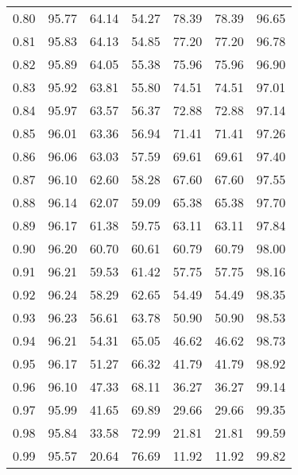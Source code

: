 \begin{tabular}{|c|c|c|c|c|c|c|}
      0.80 &     95.77 &     64.14 &      54.27 &   78.39 &      78.39 &         96.65 \\
      0.81 &     95.83 &     64.13 &      54.85 &   77.20 &      77.20 &         96.78 \\
      0.82 &     95.89 &     64.05 &      55.38 &   75.96 &      75.96 &         96.90 \\
      0.83 &     95.92 &     63.81 &      55.80 &   74.51 &      74.51 &         97.01 \\
      0.84 &     95.97 &     63.57 &      56.37 &   72.88 &      72.88 &         97.14 \\
      0.85 &     96.01 &     63.36 &      56.94 &   71.41 &      71.41 &         97.26 \\
      0.86 &     96.06 &     63.03 &      57.59 &   69.61 &      69.61 &         97.40 \\
      0.87 &     96.10 &     62.60 &      58.28 &   67.60 &      67.60 &         97.55 \\
      0.88 &     96.14 &     62.07 &      59.09 &   65.38 &      65.38 &         97.70 \\
      0.89 &     96.17 &     61.38 &      59.75 &   63.11 &      63.11 &         97.84 \\
      0.90 &     96.20 &     60.70 &      60.61 &   60.79 &      60.79 &         98.00 \\
      0.91 &     96.21 &     59.53 &      61.42 &   57.75 &      57.75 &         98.16 \\
      0.92 &     96.24 &     58.29 &      62.65 &   54.49 &      54.49 &         98.35 \\
      0.93 &     96.23 &     56.61 &      63.78 &   50.90 &      50.90 &         98.53 \\
      0.94 &     96.21 &     54.31 &      65.05 &   46.62 &      46.62 &         98.73 \\
      0.95 &     96.17 &     51.27 &      66.32 &   41.79 &      41.79 &         98.92 \\
      0.96 &     96.10 &     47.33 &      68.11 &   36.27 &      36.27 &         99.14 \\
      0.97 &     95.99 &     41.65 &      69.89 &   29.66 &      29.66 &         99.35 \\
      0.98 &     95.84 &     33.58 &      72.99 &   21.81 &      21.81 &         99.59 \\
      0.99 &     95.57 &     20.64 &      76.69 &   11.92 &      11.92 &         99.82 \\
\bottomrule
\end{tabular}
